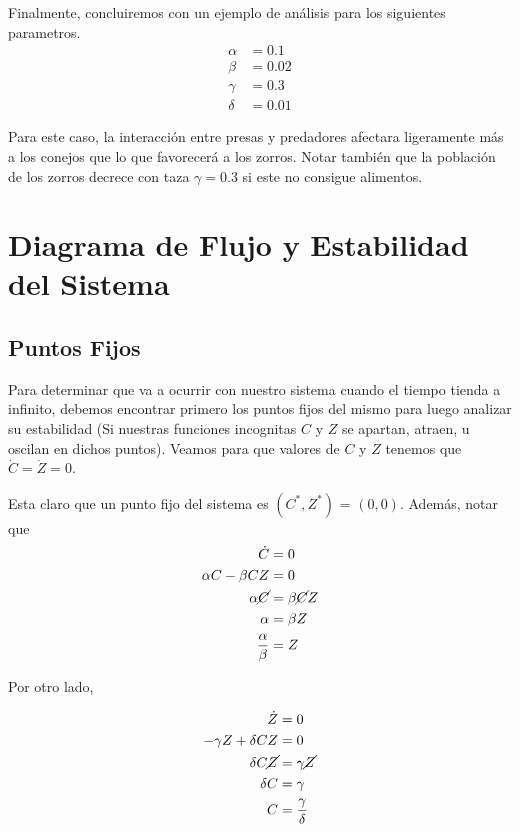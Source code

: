 \documentclass[10pt,journal,compsoc]{IEEEtran}
\begin{document}
 Finalmente, concluiremos con un ejemplo de análisis para los siguientes
 parametros.
 \begin{equation*}
  \begin{aligned}
   \alpha &= 0.1\\
   \beta &= 0.02\\
   \gamma &= 0.3\\
   \delta &= 0.01
  \end{aligned}
 \end{equation*}

 Para este caso, la interacción entre presas y predadores afectara ligeramente
 más a los conejos que lo que favorecerá a los zorros. Notar también que la
 población de los zorros decrece con taza $\gamma = 0.3$ si este no consigue
 alimentos.
 \section{Diagrama de Flujo y Estabilidad del Sistema}

 \subsection{Puntos Fijos}
 Para determinar que va a ocurrir con nuestro sistema cuando el tiempo tienda a
 infinito, debemos encontrar primero los puntos fijos del mismo para luego
 analizar su estabilidad (Si nuestras funciones incognitas $C$ y $Z$ se apartan,
 atraen, u oscilan en dichos puntos). Veamos para que valores de $C$ y $Z$
 tenemos que $\dot C = \dot Z = 0$.
 
 Esta claro que un punto fijo del sistema es $(C^{*}, Z^{*})$ = $(0, 0)$.
 Además, notar que
 \begin{equation*}
   \begin{aligned}
    \dot C &= 0 \\
    \alpha C - \beta CZ &= 0\\
    \alpha \cancel{C} &= \beta \cancel{C}Z \\
    \alpha &= \beta Z \\
    \frac{\alpha}{\beta} &= Z \\
   \end{aligned}
 \end{equation*}
 
 Por otro lado,

 \begin{equation*}
  \begin{aligned}
   \dot Z &= 0 \\
   -\gamma Z + \delta CZ &= 0\\
   \delta C\cancel{Z} &= \gamma \cancel{Z} \\
   \delta C &= \gamma \\
   C &= \frac{\gamma}{\delta}
  \end{aligned}
 \end{equation*}
\end{document}
